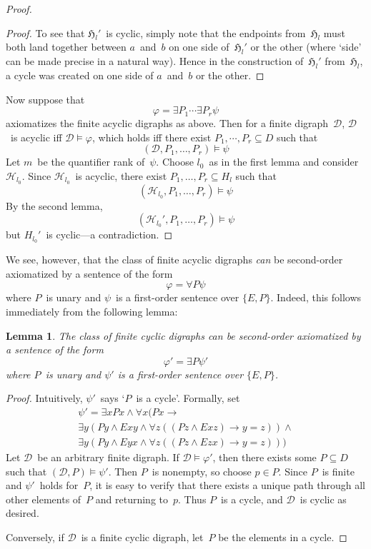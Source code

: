 \documentclass[letterpaper]{article}
\newcommand{\D}{\mathcal{D}}
\renewcommand{\H}{\mathcal{H}}
\newcommand{\Hx}{\mathfrak{H}}
\newcommand{\limp}{\rightarrow}
\theoremstyle{plain}
\newtheorem*{lem}{Lemma}
\begin{document}
\begin{proof}
\begin{proof}
To see that $\Hx_l'$~is cyclic, simply note that the endpoints from~$\Hx_l$ must both land together between $a$~and~$b$ on one side of~$\Hx_l'$ or the other (where `side' can be made precise in a natural way). Hence in the construction of~$\Hx_l'$ from~$\Hx_l$, a cycle was created on one side of $a$~and~$b$ or the other.
\end{proof}

Now suppose that
$$\varphi=\exists P_1\cdots\exists P_r\psi$$
axiomatizes the finite acyclic digraphs as above. Then for a finite digraph~$\D$, $\D$~is acyclic iff $\D\models\varphi$, which holds iff there exist $P_1,\cdots,P_r\subseteq D$ such that
$$(\D,P_1,\ldots,P_r)\models\psi$$
Let $m$~be the quantifier rank of~$\psi$. Choose $l_0$~as in the first lemma and consider~$\H_{l_0}$. Since $\H_{l_0}$~is acyclic, there exist $P_1,\ldots,P_r\subseteq H_l$ such that
$$(\H_{l_0},P_1,\ldots,P_r)\models\psi$$
By the second lemma,
$$(\H_{l_0}',P_1,\ldots,P_r)\models\psi$$
but $H_{l_0}'$~is cyclic---a contradiction.
\end{proof}

We see, however, that the class of finite acyclic digraphs \emph{can} be second-order axiomatized by a sentence of the form
$$\varphi=\forall P\psi$$
where $P$~is unary and $\psi$~is a first-order sentence over $\{E,P\}$. Indeed, this follows immediately from the following lemma:
\begin{lem}
The class of finite cyclic digraphs can be second-order axiomatized by a sentence of the form
$$\varphi'=\exists P\psi'$$
where $P$~is unary and $\psi'$ is a first-order sentence over $\{E,P\}$.
\end{lem}
\begin{proof}
Intuitively, $\psi'$~says `$P$~is a cycle'. Formally, set
\begin{multline*}
\psi'=\exists x Px\land\forall x(Px\limp\\
	\exists y(Py\land Exy\land\forall z((Pz\land Exz)\limp y=z))\land\\
	\exists y(Py\land Eyx\land\forall z((Pz\land Ezx)\limp y=z)))
\end{multline*}
Let $\D$~be an arbitrary finite digraph. If $\D\models\varphi'$, then there exists some $P\subseteq D$ such that $(\D,P)\models\psi'$. Then $P$~is nonempty, so choose $p\in P$. Since $P$~is finite and $\psi'$~holds for~$P$, it is easy to verify that there exists a unique path through all other elements of~$P$ and returning to~$p$. Thus $P$~is a cycle, and $\D$~is cyclic as desired.

Conversely, if $\D$~is a finite cyclic digraph, let~$P$ be the elements in a cycle.
\end{proof}
\end{document}
